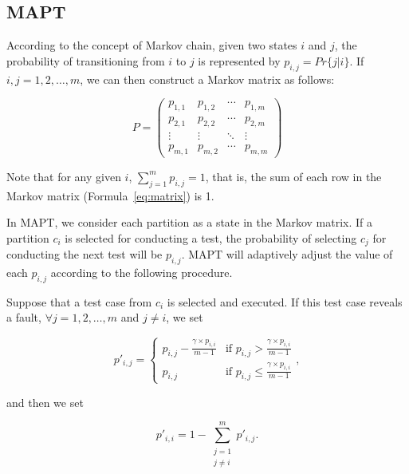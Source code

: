 \documentclass[10pt,journal,compsoc]{IEEEtran}
\begin{document}
\subsection{MAPT}

According to the concept of Markov chain, given two states $i$ and $j$, the probability of transitioning from $i$ to $j$ is represented by $p_{i,j} = Pr\{j|i\}$. If $i, j = 1, 2, \ldots, m$, we can then construct a Markov matrix as follows:

\begin{equation}
\label{eq:matrix}
P =
\begin{pmatrix}
	p_{1,1} & p_{1,2} & \cdots & p_{1,m} \\
	p_{2,1} & p_{2,2} & \cdots & p_{2,m} \\
	\vdots  & \vdots  & \ddots & \vdots  \\
	p_{m,1} & p_{m,2} & \cdots & p_{m,m}
\end{pmatrix}
\end{equation}

Note that for any given $i$, $\sum_{j=1}^{m}p_{i,j} = 1$, that is, the sum of each row in the Markov matrix (Formula~\ref{eq:matrix}) is 1.

In MAPT, we consider each partition as a state in the Markov matrix. If a partition $c_i$ is selected for conducting a test, the probability of selecting $c_j$ for conducting the next test will be $p_{i,j}$. MAPT will adaptively adjust the value of each $p_{i,j}$ according to the following procedure.

Suppose that a test case from $c_i$ is selected and executed. If this test case reveals a fault, $\forall j = 1, 2, \ldots, m$ and $j \neq i$, we set

\begin{equation}
\label{eq:MAPThitJ}
p'_{i,j} =
\begin{cases}
p_{i,j} - \displaystyle\frac{\gamma \times p_{i,i}}{m-1} & \text{if } p_{i,j} > \displaystyle\frac{\gamma \times p_{i,i}}{m-1} \\
p_{i,j} & \text{if } p_{i,j} \leq \displaystyle\frac{\gamma \times p_{i,i}}{m-1}
\end{cases},
\end{equation}

and then we set

\begin{equation}
\label{eq:MAPThitI}
p'_{i,i} = 1 - \sum_{\substack{j = 1 \\ j \neq i}}^m p'_{i,j}.
\end{equation}
\end{document}
